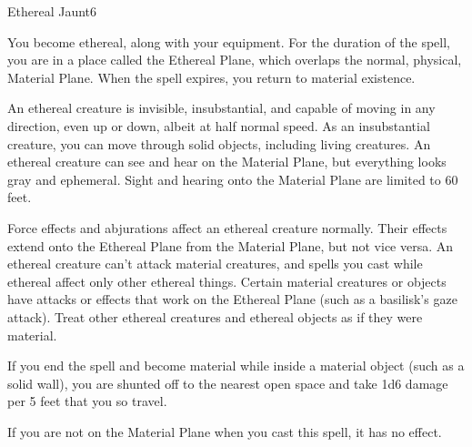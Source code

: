 \begin{spellsection}{Ethereal Jaunt}{6}
\begin{spellheader}
\end{spellheader}
\begin{spellcontent}
    \begin{spelltargetinginfo}
    \end{spelltargetinginfo}
    \begin{spelleffects}
        \spelleffect You become ethereal, along with your equipment. For the duration of the spell, you are in a place called the Ethereal Plane, which overlaps the normal, physical, Material Plane. When the spell expires, you return to material existence.
        \par An ethereal creature is invisible, insubstantial, and capable of moving in any direction, even up or down, albeit at half normal speed. As an insubstantial creature, you can move through solid objects, including living creatures. An ethereal creature can see and hear on the Material Plane, but everything looks gray and ephemeral. Sight and hearing onto the Material Plane are limited to 60 feet.
        \par Force effects and abjurations affect an ethereal creature normally. Their effects extend onto the Ethereal Plane from the Material Plane, but not vice versa. An ethereal creature can't attack material creatures, and spells you cast while ethereal affect only other ethereal things. Certain material creatures or objects have attacks or effects that work on the Ethereal Plane (such as a basilisk's gaze attack). Treat other ethereal creatures and ethereal objects as if they were material. 
        \par If you end the spell and become material while inside a material object (such as a solid wall), you are shunted off to the nearest open space and take 1d6 damage per 5 feet that you so travel.
        \spelldur \durshort \dismissable
    \end{spelleffects}
\end{spellcontent}
\begin{spellfooter}
    \spellnotes If you are not on the Material Plane when you cast this spell, it has no effect.
\end{spellfooter}
\end{spellsection}

